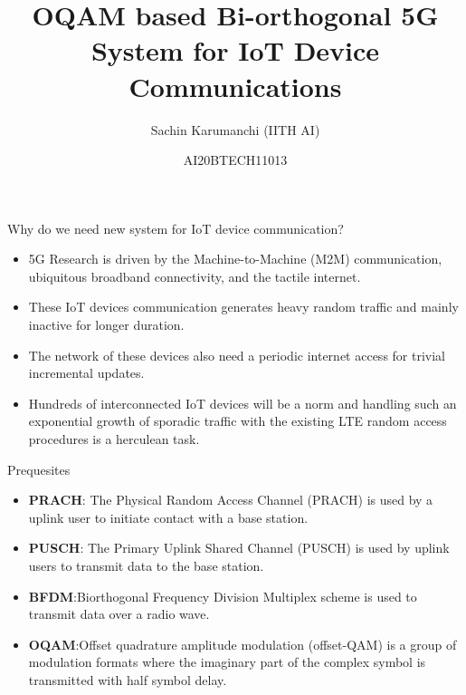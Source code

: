 \documentclass{beamer}
\title{OQAM based Bi-orthogonal 5G System for IoT Device Communications}
\author{Sachin Karumanchi (IITH AI)}
\date{AI20BTECH11013}
\begin{document}
%
\begin{frame}
\titlepage
\end{frame}
\begin{frame}{Why do we need new system for IoT device communication?}
    \begin{itemize}
        \item 5G Research is driven by the Machine-to-Machine (M2M) communication, ubiquitous broadband connectivity, and the tactile internet.\
        \item These IoT devices communication generates heavy random traffic and mainly inactive for longer duration.
        \item The network of these devices also need a periodic internet access for trivial incremental updates. 
        \item  Hundreds of interconnected IoT devices will be a norm and handling such an exponential growth of sporadic traffic with the existing LTE random access procedures is a herculean task. 
    \end{itemize}
\end{frame}
\begin{frame}
    \begin{block}{Prequesites}
    \begin{itemize}
        \item \textbf{PRACH}: The Physical Random Access Channel (PRACH) is used by a uplink user to initiate contact with a base station. 
        \item \textbf{PUSCH}: The Primary Uplink Shared Channel (PUSCH) is used by uplink users to transmit data to the base station.
        \item \textbf{BFDM}:Biorthogonal Frequency Division Multiplex scheme is used to transmit data over a radio wave.
        \item \textbf{OQAM}:Offset quadrature amplitude modulation (offset-QAM) is a group of modulation formats where the imaginary part of the complex symbol is transmitted with half symbol delay. 
    \end{itemize}
    \end{block}
\end{frame}
\end{document}
